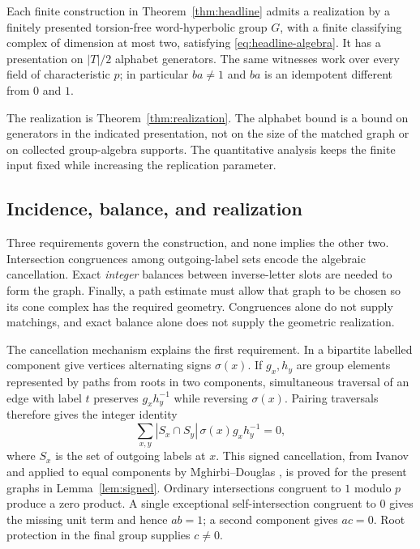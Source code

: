 \begin{corollary}\label{cor:headline}
Each finite construction in Theorem~\ref{thm:headline} admits a realization by a finitely presented torsion-free word-hyperbolic group $G$, with a finite classifying complex of dimension at most two, satisfying \eqref{eq:headline-algebra}. It has a presentation on $|T|/2$ alphabet generators. The same witnesses work over every field of characteristic $p$; in particular $ba\ne1$ and $ba$ is an idempotent different from $0$ and $1$.
\end{corollary}

The realization is Theorem~\ref{thm:realization}. The alphabet bound is a bound on generators in the indicated presentation, not on the size of the matched graph or on collected group-algebra supports. The quantitative analysis keeps the finite input fixed while increasing the replication parameter.

\subsection{Incidence, balance, and realization}
Three requirements govern the construction, and none implies the other two. Intersection congruences among outgoing-label sets encode the algebraic cancellation. Exact \emph{integer} balances between inverse-letter slots are needed to form the graph. Finally, a path estimate must allow that graph to be chosen so its cone complex has the required geometry. Congruences alone do not supply matchings, and exact balance alone does not supply the geometric realization.

The cancellation mechanism explains the first requirement. In a bipartite labelled component give vertices alternating signs $\sigma(x)$. If $g_x,h_y$ are group elements represented by paths from roots in two components, simultaneous traversal of an edge with label $t$ preserves $g_xh_y^{-1}$ while reversing $\sigma(x)$. Pairing traversals therefore gives the integer identity
\[
 \sum_{x,y}|S_x\cap S_y|\,\sigma(x)g_xh_y^{-1}=0,
\]
where $S_x$ is the set of outgoing labels at $x$. This signed cancellation, from Ivanov \cite[Lemma~2.2]{Iva26} and applied to equal components by Mghirbi--Douglas \cite[Section~7]{MD26}, is proved for the present graphs in Lemma~\ref{lem:signed}. Ordinary intersections congruent to $1$ modulo $p$ produce a zero product. A single exceptional self-intersection congruent to $0$ gives the missing unit term and hence $ab=1$; a second component gives $ac=0$. Root protection in the final group supplies $c\ne0$.

